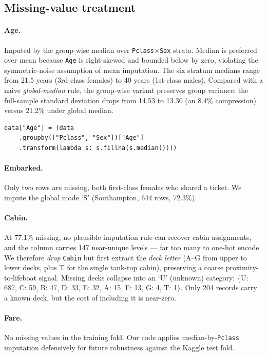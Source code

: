 \documentclass[10pt,a4paper,twocolumn]{article}
\begin{document}
\subsection{Missing-value treatment}
\paragraph{Age.} Imputed by the group-wise median over \texttt{Pclass$\times$Sex}
strata. Median is preferred over mean because \texttt{Age} is right-skewed and bounded
below by zero, violating the symmetric-noise assumption of mean imputation.
The six stratum medians range from 21.5 years (3rd-class females) to 40 years
(1st-class males). Compared with a naive \emph{global-median} rule, the group-wise
variant preserves group variance: the full-sample standard deviation drops from
14.53 to 13.30 (an 8.4\% compression) versus 21.2\% under global median.

\begin{lstlisting}[caption={Group-wise median imputation of \texttt{Age}.},label={lst:ageimp}]
data["Age"] = (data
    .groupby(["Pclass", "Sex"])["Age"]
    .transform(lambda s: s.fillna(s.median())))
\end{lstlisting}

\paragraph{Embarked.} Only two rows are missing, both first-class females who shared
a ticket. We impute the global mode `S' (Southampton, 644 rows, 72.3\%).

\paragraph{Cabin.} At 77.1\% missing, no plausible imputation rule can recover cabin
assignments, and the column carries 147 near-unique levels --- far too many to
one-hot encode. We therefore \emph{drop} \texttt{Cabin} but first extract the
\emph{deck letter} (A--G from upper to lower decks, plus T for the single
tank-top cabin), preserving a coarse proximity-to-lifeboat signal. Missing decks
collapse into an `U' (unknown) category: \{U: 687, C: 59, B: 47, D: 33, E: 32,
A: 15, F: 13, G: 4, T: 1\}. Only 204 records carry a known deck, but the cost of
including it is near-zero.

\paragraph{Fare.} No missing values in the training fold. Our code applies
median-by-\texttt{Pclass} imputation defensively for future robustness against
the Kaggle test fold.
\end{document}
